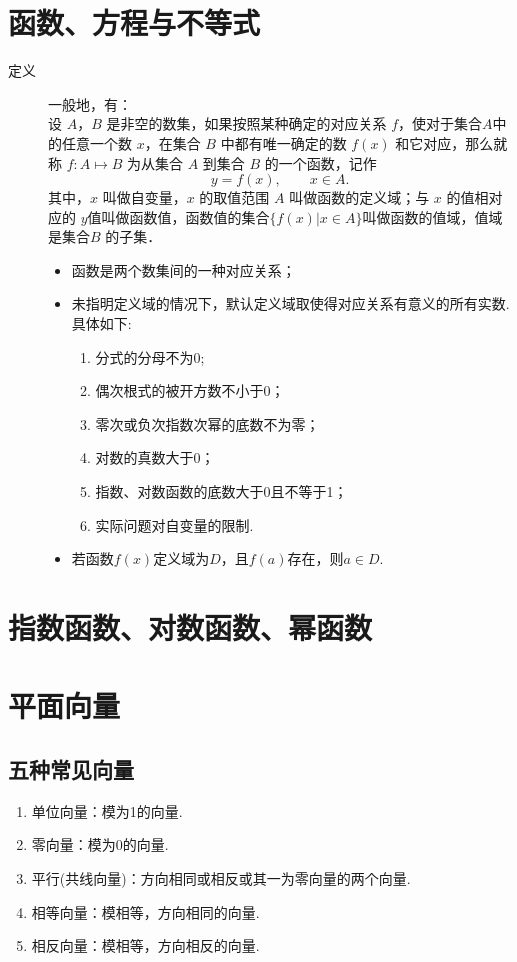 \section{函数、方程与不等式}
  \begin{description}
    \item [定义] 一般地，有：\\
      设 $A$，$B$ 是非空的数集，如果按照某种确定的对应关系 $f$，使对于集合$A$中的任意一个数 $x$，在集合 $B$ 中都有唯一确定的数 $f(x)$ 和它对应，那么就称 $f\colon A\mapsto B$ 为从集合 $A$ 到集合 $B$ 的一个函数，记作
      $$y=f(x),\qquad x\in A.$$
      其中，$x$ 叫做自变量，$x$ 的取值范围 $A$ 叫做函数的定义域；与 $x$ 的值相对应的 $y $值叫做函数值，函数值的集合$\{f(x)|x\in A\}$叫做函数的值域，值域是集合$B$ 的子集．
      \begin{itemize}[leftmargin=*]
        \FCom
        \item 函数是两个数集间的一种对应关系；
        \item 未指明定义域的情况下，默认定义域取使得对应关系有意义的所有实数. 具体如下:
        \begin{enumerate}[label=\circled{\arabic*}]
          \item 分式的分母不为0;
          \item 偶次根式的被开方数不小于0；
          \item 零次或负次指数次幂的底数不为零；
          \item 对数的真数大于0；
          \item 指数、对数函数的底数大于0且不等于1；
          \item 实际问题对自变量的限制.
        \end{enumerate}
        \item 若函数$f(x)$定义域为$D$，且$f(a)$存在，则$a\in D$.
      \end{itemize}
  \end{description}
\section{指数函数、对数函数、幂函数}
\section{平面向量}
  \subsection{五种常见向量}
    \begin{enumerate}[label=\arabic*)]
      \item 单位向量：模为1的向量.
      \item 零向量：模为0的向量.
      \item 平行(共线向量)：方向相同或相反或其一为零向量的两个向量.
      \item 相等向量：模相等，方向相同的向量.
      \item 相反向量：模相等，方向相反的向量.
    \end{enumerate}
